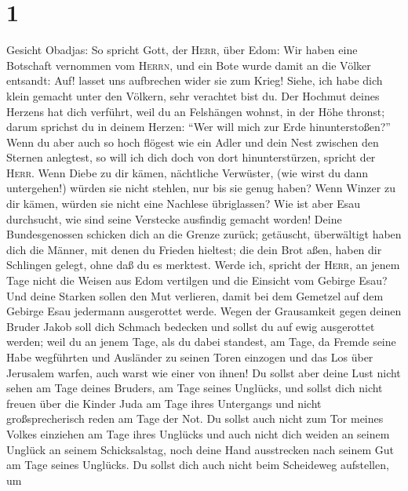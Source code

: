 \hypertarget{section}{%
\section{1}\label{section}}

 Gesicht Obadjas: So spricht Gott, der \textsc{Herr}, über
Edom: Wir haben eine Botschaft vernommen vom \textsc{Herrn}, und ein
Bote wurde damit an die Völker entsandt: Auf! lasset uns aufbrechen
wider sie zum Krieg!  Siehe, ich habe dich klein gemacht
unter den Völkern, sehr verachtet bist du.  Der Hochmut
deines Herzens hat dich verführt, weil du an Felshängen wohnst, in der
Höhe thronst; darum sprichst du in deinem Herzen: ``Wer will mich zur
Erde hinunterstoßen?''  Wenn du aber auch so hoch flögest
wie ein Adler und dein Nest zwischen den Sternen anlegtest, so will ich
dich doch von dort hinunterstürzen, spricht der \textsc{Herr}.
 Wenn Diebe zu dir kämen, nächtliche Verwüster, (wie wirst
du dann untergehen!) würden sie nicht stehlen, nur bis sie genug haben?
Wenn Winzer zu dir kämen, würden sie nicht eine Nachlese übriglassen?
 Wie ist aber Esau durchsucht, wie sind seine Verstecke
ausfindig gemacht worden!  Deine Bundesgenossen schicken
dich an die Grenze zurück; getäuscht, überwältigt haben dich die Männer,
mit denen du Frieden hieltest; die dein Brot aßen, haben dir Schlingen
gelegt, ohne daß du es merktest.  Werde ich, spricht der
\textsc{Herr}, an jenem Tage nicht die Weisen aus Edom vertilgen und die
Einsicht vom Gebirge Esau?  Und deine Starken sollen den
Mut verlieren, damit bei dem Gemetzel auf dem Gebirge Esau jedermann
ausgerottet werde.  Wegen der Grausamkeit gegen deinen
Bruder Jakob soll dich Schmach bedecken und sollst du auf ewig
ausgerottet werden;  weil du an jenem Tage, als du dabei
standest, am Tage, da Fremde seine Habe wegführten und Ausländer zu
seinen Toren einzogen und das Los über Jerusalem warfen, auch warst wie
einer von ihnen!  Du sollst aber deine Lust nicht sehen
am Tage deines Bruders, am Tage seines Unglücks, und sollst dich nicht
freuen über die Kinder Juda am Tage ihres Untergangs und nicht
großsprecherisch reden am Tage der Not.  Du sollst auch
nicht zum Tor meines Volkes einziehen am Tage ihres Unglücks und auch
nicht dich weiden an seinem Unglück an seinem Schicksalstag, noch deine
Hand ausstrecken nach seinem Gut am Tage seines Unglücks.
 Du sollst dich auch nicht beim Scheideweg aufstellen, um
